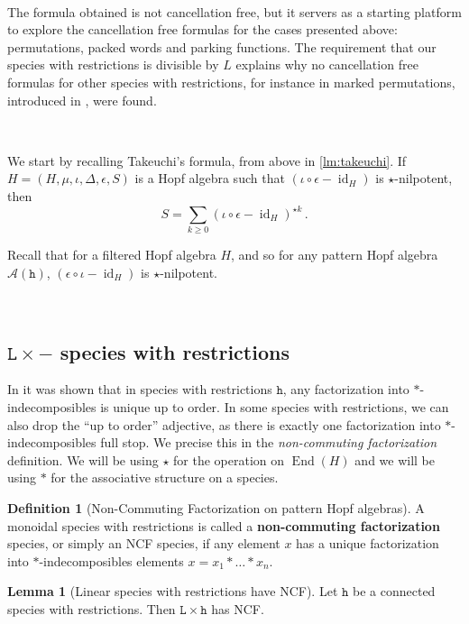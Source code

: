 \documentclass[12pt, reqno]{amsart}
\theoremstyle{definition}
\newtheorem{lm}[thm]{Lemma}
\newtheorem{defin}[thm]{Definition}
\DeclareMathOperator{\id}{id}
\DeclareMathOperator{\End}{\mathrm{End}}
\begin{document}
\

The formula obtained is not cancellation free, but it servers as a starting platform to explore the cancellation free formulas for the cases presented above: permutations, packed words and parking functions. The requirement that our species with restrictions is divisible by $L$ explains why no cancellation free formulas for other species with restrictions, for instance in marked permutations, introduced in \cite{Penaguiao2020}, were found.

\

We start by recalling Takeuchi's formula, from above in \cref{lm:takeuchi}.
If $H = (H, \mu, \iota, \Delta, \epsilon, S)$ is a Hopf algebra such that $(  \iota  \circ\epsilon - \id_H)$ is $\star$-nilpotent, then 
$$S = \sum_{k\geq 0 }  ( \iota  \circ\epsilon- \id_H)^{\star k}\, . $$

Recall that for a filtered Hopf algebra $H$, and so for any pattern Hopf algebra $\mathcal A (\mathtt{h})$, $(\epsilon\circ \iota - \id_H)$ is $\star$-nilpotent. 

\

\subsection{$\mathtt{L}\times -$ species with restrictions}


In \cite[Corollary 3.4.]{Penaguiao2020} it was shown that in species with restrictions $\mathtt{h}$, any factorization into $\ast$-indecomposibles is unique up to order.
In some species with restrictions, we can also drop the ``up to order'' adjective, as there is exactly one factorization into $\ast$-indecomposibles full stop. We precise this in the \textit{non-commuting factorization} definition.
We will be using $\star$ for the operation on $\End (H)$ and we will be using $\ast $ for the associative structure on a species.



\begin{defin}[Non-Commuting Factorization on pattern Hopf algebras]\label{defin:ncf}
A monoidal species with restrictions is called a \textbf{non-commuting factorization} species, or simply an NCF species, if any element $x$ has a unique factorization into $\ast$-indecomposibles elements $x = x_1 \ast \dots \ast x_n$.
\end{defin}


\begin{lm}[Linear species with restrictions have NCF]
Let $\mathtt{h}$ be a connected species with restrictions.
Then $\mathtt{L} \times \mathtt{h}$ has NCF.
\end{lm}
\end{document}
